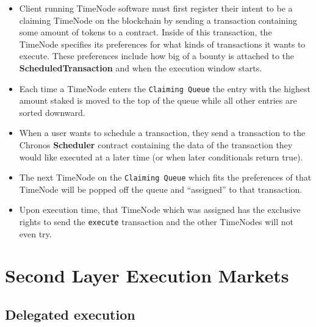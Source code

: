 \documentclass{report}
\begin{document}
  \begin{itemize}
    \item Client running TimeNode software must first register their intent to be a claiming TimeNode on the blockchain by sending a transaction containing some amount of tokens to a contract. Inside of this transaction, the TimeNode specifies its preferences for what kinds of transactions it wants to execute. These preferences include how big of a bounty is attached to the \textbf{ScheduledTransaction} and when the execution window starts.
    \item Each time a TimeNode enters the \texttt{Claiming Queue} the entry with the highest amount staked is moved to the top of the queue while all other entries are sorted downward.
    \item When a user wants to schedule a transaction, they send a transaction to the Chronos \textbf{Scheduler} contract containing the data of the transaction they would like executed at a later time (or when later conditionals return true).
    \item The next TimeNode on the \texttt{Claiming Queue} which fits the preferences of that TimeNode will be popped off the queue and “assigned” to that transaction.
    \item Upon execution time, that TimeNode which was assigned has the exclusive rights to send the \texttt{execute} transaction and the other TimeNodes will not even try.
  \end{itemize}

  \chapter{Second Layer Execution Markets}
  \section{Delegated execution}
  
\end{document}
